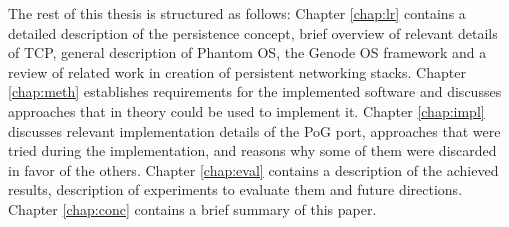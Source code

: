 The rest of this thesis is structured as follows: Chapter \ref{chap:lr}
contains a detailed description of the persistence concept, brief overview of 
relevant details of TCP, general description of Phantom OS, the Genode OS
framework  and a review of related work in creation of persistent networking
stacks. Chapter \ref{chap:meth} establishes requirements for the implemented
software and discusses approaches that in theory could be used to implement it.
Chapter \ref{chap:impl} discusses relevant implementation details of the PoG
port, approaches that were tried during the implementation, and reasons
why some of them were discarded in favor of the others. Chapter \ref{chap:eval}
contains a description of the achieved results, description of experiments to
evaluate them and future directions.  Chapter \ref{chap:conc} contains a brief
summary of this paper.

